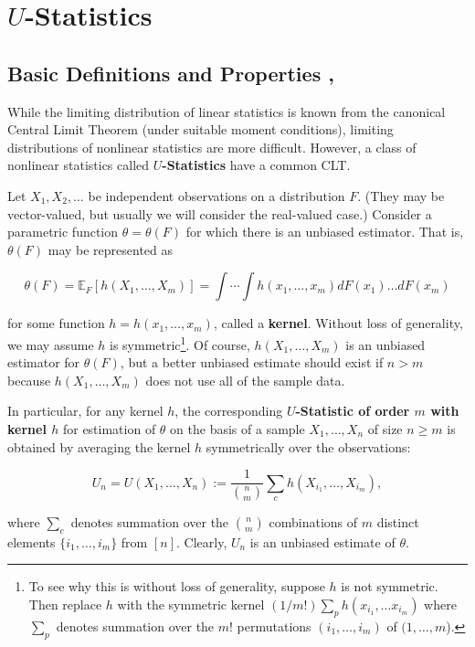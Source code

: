 \section{\(U\)-Statistics}\label{mathstats.sec.u.stats}

\subsection{Basic Definitions and Properties \cite[Sections 5.1 and 5.2]{serfling1980}, \cite[Section 15.1]{dasgupta2008asymptotic}}

While the limiting distribution of linear statistics is known from the canonical Central Limit Theorem (under suitable moment conditions), limiting distributions of nonlinear statistics are more difficult. However, a class of nonlinear statistics called \textbf{\(U\)-Statistics} have a common CLT.

\begin{definition}\label{mathstats.def.u.stat}

Let \(X_1, X_2, \ldots\) be independent observations on a distribution \(F\). (They may be vector-valued, but usually we will consider the real-valued case.) Consider a parametric function \(\theta = \theta(F)\) for which there is an unbiased estimator. That is, \(\theta(F)\) may be represented as

\[
\theta(F) = \mathbb{E}_F\left[h \left(X_1, \ldots, X_m\right) \right] = \int \cdots \int h(x_1, \ldots, x_m) dF(x_1) \ldots dF(x_m)
\]

for some function \(h = h(x_1, \ldots, x_m)\), called a \textbf{kernel}. Without loss of generality, we may assume \(h\) is symmetric\footnote{To see why this is without loss of generality, suppose \(h\) is not symmetric. Then replace \(h\) with the symmetric kernel \((1/m!) \sum_p h(x_{i_1}, \ldots x_{i_m})\) where \(\sum_p\) denotes summation over the \(m!\) permutations \((i_1, \ldots, i_m)\) of \((1, \ldots , m\)).}. Of course, \(h(X_1, \ldots, X_m)\) is an unbiased estimator for \(\theta(F)\), but a better unbiased estimate should exist if \(n > m\) because \(h(X_1, \ldots, X_m)\) does not use all of the sample data.

In particular, for any kernel \(h\), the corresponding \textbf{\(U\)-Statistic of order \(m\) with kernel \(h\)} for estimation of \(\theta\) on the basis of a sample \(X_1, \ldots, X_n\) of size \(n \geq m\) is obtained by averaging the kernel \(h\) symmetrically over the observations:

\[
U_n = U(X_1, \ldots, X_n) := \frac{1}{\binom{n}{m}} \sum_c h(X_{i_1}, \ldots, X_{i_m}),
\]

where \(\sum_c\) denotes summation over the \(\binom{n}{m}\) combinations of \(m\) distinct elements \(\{i_1, \ldots, i_m\}\) from \([n]\). Clearly, \(U_n\) is an unbiased estimate of \(\theta\).

\end{definition}

